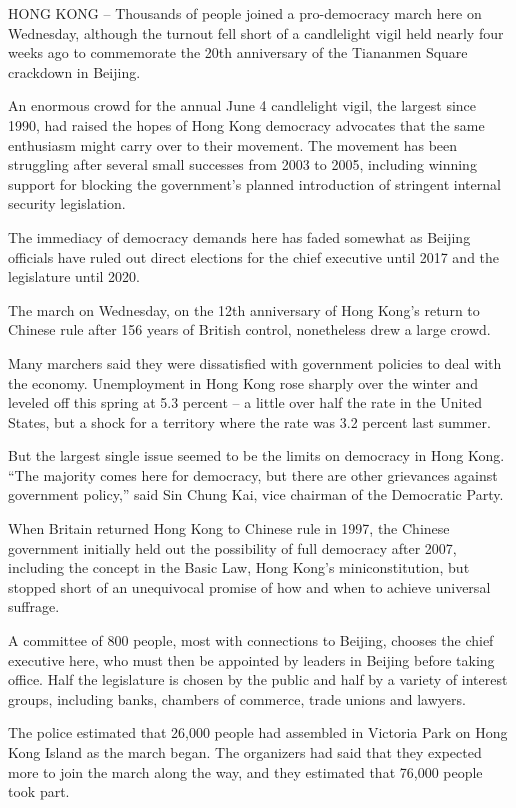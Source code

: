 ﻿\documentclass[12pt]{article}
\begin{document}
HONG KONG -- Thousands of people joined a pro-democracy march here on Wednesday, although the
turnout fell short of a candlelight vigil held nearly four weeks ago to commemorate the 20th
anniversary of the Tiananmen Square crackdown in Beijing.

An enormous crowd for the annual June 4 candlelight vigil, the largest since 1990, had raised the
hopes of Hong Kong democracy advocates that the same enthusiasm might carry over to their movement.
The movement has been struggling after several small successes from 2003 to 2005, including winning
support for blocking the government's planned introduction of stringent internal security
legislation.

The immediacy of democracy demands here has faded somewhat as Beijing officials have ruled out
direct elections for the chief executive until 2017 and the legislature until 2020.

The march on Wednesday, on the 12th anniversary of Hong Kong's return to Chinese rule after 156
years of British control, nonetheless drew a large crowd.

Many marchers said they were dissatisfied with government policies to deal with the economy.
Unemployment in Hong Kong rose sharply over the winter and leveled off this spring at 5.3 percent --
a little over half the rate in the United States, but a shock for a territory where the rate was 3.2
percent last summer.

But the largest single issue seemed to be the limits on democracy in Hong Kong. ``The majority comes
here for democracy, but there are other grievances against government policy,'' said Sin Chung Kai,
vice chairman of the Democratic Party.

When Britain returned Hong Kong to Chinese rule in 1997, the Chinese government initially held out
the possibility of full democracy after 2007, including the concept in the Basic Law, Hong Kong's
miniconstitution, but stopped short of an unequivocal promise of how and when to achieve universal
suffrage.

A committee of 800 people, most with connections to Beijing, chooses the chief executive here, who
must then be appointed by leaders in Beijing before taking office. Half the legislature is chosen by
the public and half by a variety of interest groups, including banks, chambers of commerce, trade
unions and lawyers.

The police estimated that 26,000 people had assembled in Victoria Park on Hong Kong Island as the
march began. The organizers had said that they expected more to join the march along the way, and
they estimated that 76,000 people took part.
\end{document}
